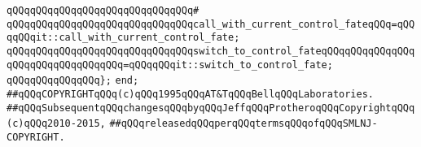 \verb|qQQqqQQqqQQqqQQqqQQqqQQqqQQqqQQq#|\newline
\verb|qQQqqQQqqQQqqQQqqQQqqQQqqQQqqQQqcall_with_current_control_fateqQQq=qQQqqQQqit::call_with_current_control_fate;|\newline
\verb|qQQqqQQqqQQqqQQqqQQqqQQqqQQqqQQqswitch_to_control_fateqQQqqQQqqQQqqQQqqQQqqQQqqQQqqQQqqQQq=qQQqqQQqit::switch_to_control_fate;|\newline
\verb|qQQqqQQqqQQqqQQq};|\newline
\verb|end;|\newline
\newline
\newline
\newline
\verb|##qQQqCOPYRIGHTqQQq(c)qQQq1995qQQqAT&TqQQqBellqQQqLaboratories.|\newline
\verb|##qQQqSubsequentqQQqchangesqQQqbyqQQqJeffqQQqProtheroqQQqCopyrightqQQq(c)qQQq2010-2015,|\newline
\verb|##qQQqreleasedqQQqperqQQqtermsqQQqofqQQqSMLNJ-COPYRIGHT.|\newline

